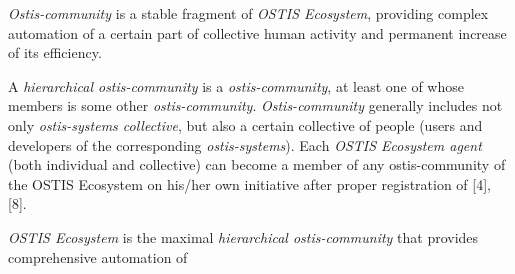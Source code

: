 \documentclass[a4paper,10pt]{article}
\begin{document}
\begin{multicols}{2}
\textit{Ostis-community} is a stable fragment of \textit{OSTIS Ecosystem}, providing complex automation of a certain part of
collective human activity and permanent increase of its
efficiency.


A \textit{hierarchical ostis-community} is a \textit{ostis-community},
at least one of whose members is some other \textit{ostis-community}. \textit{Ostis-community} generally includes not only
\textit{ostis-systems collective}, but also a certain collective of
people (users and developers of the corresponding \textit{ostis-systems}). Each\textit{ OSTIS Ecosystem agent} (both individual
and collective) can become a member of any ostis-community of the OSTIS Ecosystem on his/her own
initiative after proper registration of [4], [8].


\textit{OSTIS Ecosystem} is the maximal \textit{hierarchical ostis-community} that provides comprehensive automation of

\end{multicols}
\end{document}
